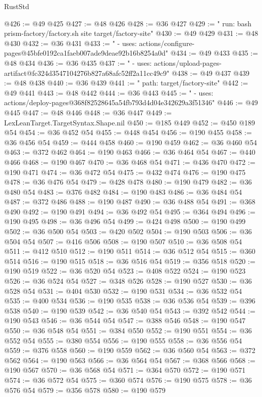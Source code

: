 \begin{lexlean}{RustStd}
\begin{coremodule}
@426 := @49 @425
@427 := @48 @426
@428 := @36 @427
@429 := "        run: bash prism-factory/factory.sh site target/factory-site"
@430 := @49 @429
@431 := @48 @430
@432 := @36 @431
@433 := "      - uses: actions/configure-pages@45bfe0192ca1faeb007ade9deae92b16b8254a0d"
@434 := @49 @433
@435 := @48 @434
@436 := @36 @435
@437 := "      - uses: actions/upload-pages-artifact@fc324d3547104276b827a68afc52ff2a11cc49c9"
@438 := @49 @437
@439 := @48 @438
@440 := @36 @439
@441 := "          path: target/factory-site"
@442 := @49 @441
@443 := @48 @442
@444 := @36 @443
@445 := "      - uses: actions/deploy-pages@368f82528645a54fb793d4d04e342629a3f51346"
@446 := @49 @445
@447 := @48 @446
@448 := @36 @447
@449 := LexLeanTarget.TargetSyntax.Shape.nil
@450 := @185 @449
@452 := @450 @189 @54
@454 := @36 @452 @54
@455 := @448 @454
@456 := @190 @455
@458 := @36 @456 @54
@459 := @444 @458
@460 := @190 @459
@462 := @36 @460 @54
@463 := @372 @462
@464 := @190 @463
@466 := @36 @464 @54
@467 := @440 @466
@468 := @190 @467
@470 := @36 @468 @54
@471 := @436 @470
@472 := @190 @471
@474 := @36 @472 @54
@475 := @432 @474
@476 := @190 @475
@478 := @36 @476 @54
@479 := @428 @478
@480 := @190 @479
@482 := @36 @480 @54
@483 := @376 @482
@484 := @190 @483
@486 := @36 @484 @54
@487 := @372 @486
@488 := @190 @487
@490 := @36 @488 @54
@491 := @368 @490
@492 := @190 @491
@494 := @36 @492 @54
@495 := @364 @494
@496 := @190 @495
@498 := @36 @496 @54
@499 := @424 @498
@500 := @190 @499
@502 := @36 @500 @54
@503 := @420 @502
@504 := @190 @503
@506 := @36 @504 @54
@507 := @416 @506
@508 := @190 @507
@510 := @36 @508 @54
@511 := @412 @510
@512 := @190 @511
@514 := @36 @512 @54
@515 := @360 @514
@516 := @190 @515
@518 := @36 @516 @54
@519 := @356 @518
@520 := @190 @519
@522 := @36 @520 @54
@523 := @408 @522
@524 := @190 @523
@526 := @36 @524 @54
@527 := @348 @526
@528 := @190 @527
@530 := @36 @528 @54
@531 := @404 @530
@532 := @190 @531
@534 := @36 @532 @54
@535 := @400 @534
@536 := @190 @535
@538 := @36 @536 @54
@539 := @396 @538
@540 := @190 @539
@542 := @36 @540 @54
@543 := @392 @542
@544 := @190 @543
@546 := @36 @544 @54
@547 := @388 @546
@548 := @190 @547
@550 := @36 @548 @54
@551 := @384 @550
@552 := @190 @551
@554 := @36 @552 @54
@555 := @380 @554
@556 := @190 @555
@558 := @36 @556 @54
@559 := @376 @558
@560 := @190 @559
@562 := @36 @560 @54
@563 := @372 @562
@564 := @190 @563
@566 := @36 @564 @54
@567 := @368 @566
@568 := @190 @567
@570 := @36 @568 @54
@571 := @364 @570
@572 := @190 @571
@574 := @36 @572 @54
@575 := @360 @574
@576 := @190 @575
@578 := @36 @576 @54
@579 := @356 @578
@580 := @190 @579

\end{coremodule}
\end{lexlean}
